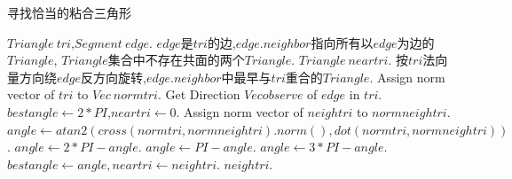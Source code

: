 \documentclass[a4paper]{book}
\renewcommand{\algorithmicrequire}{\textbf{输入:}}
\renewcommand{\algorithmicensure}{\textbf{输出:}}
\renewcommand{\algorithmicrequire}{\textbf{Input : }}
\renewcommand{\algorithmicrequire}{\textbf{Precondition : }}
\renewcommand{\algorithmicensure}{\textbf{Output : }}
\renewcommand{\algorithmicensure}{\textbf{Postcondition : }}
\numberwithin{equation}{chapter}
\theoremstyle{definition}
\begin{document}
\begin{algorithm}
	\label{alg:4}
	\caption{寻找恰当的粘合三角形}
	\begin{algorithmic}[1]
		\renewcommand{\algorithmicrequire}{\textbf{Input : }}
		\Require $Triangle\ tri$,$Segment\ edge$.
		\renewcommand{\algorithmicrequire}{\textbf{Precondition : }}
		\Require $edge$是$tri$的边,$edge.neighbor$指向所有以$edge$为边的$Triangle$,
		$Triangle$集合中不存在共面的两个$Triangle$.
		\renewcommand{\algorithmicensure}{\textbf{Output : }}
		\Ensure $Triangle\ neartri$.
		\renewcommand{\algorithmicensure}{\textbf{Postcondition : }}
		\Ensure 按$tri$法向量方向绕$edge$反方向旋转,$edge.neighbor$中最早与$tri$重合的$Triangle$.
		\State Assign norm vector of $tri$ to $Vec\ normtri$.
		\State Get Direction $Vec observe$ of $edge$ in $tri$.
		\State $bestangle \gets 2*PI$,$neartri \gets 0$.
		\State Assign norm vector of $neightri$ to $normneightri$.
		\State $angle \gets atan2(cross(normtri,normneightri).norm(), dot(normtri,normneightri))$.
		\State $angle \gets 2 * PI - angle$.
		\EndIf
		\State $angle \gets PI - angle$.
		\Else
		\State $angle \gets 3 * PI - angle$.
		\EndIf
		\State $bestangle \gets angle, neartri \gets neightri$. 
		\EndIf
		\EndIf
		\EndFor
		\State \Return $neightri$.
		\EndFunction
	\end{algorithmic}
\end{algorithm}
\end{document}
